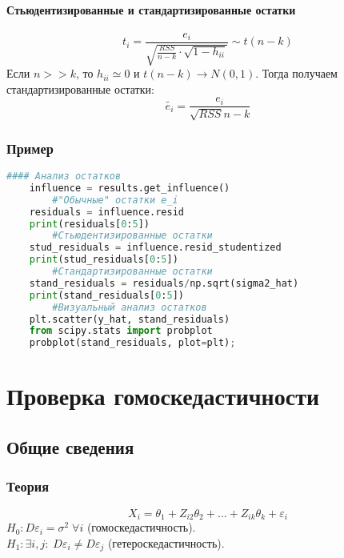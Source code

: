 \paragraph*{Стьюдентизированные и стандартизированные остатки}\label{cha:linreg/sec:det+ost/subsec:ost/subsubsec:theory/par:stu}

$$t_i = \frac{e_i}{\sqrt{\frac{RSS}{n-k} \cdot \sqrt{1-h_{ii}}}} \sim t(n-k)$$
Если $n >> k$, то $h_{ii} \simeq 0$ и $t(n-k) \to N(0,1)$. Тогда получаем стандартизированные остатки: 
$$\tilde{e_i} = \frac{e_i}{\sqrt{RSS}{n-k}}$$

\subsubsection*{Пример}\label{cha:linreg/sec:det+ost/subsec:ost/subsubsec:prob}

\begin{lstlisting}[language=Python]
	#### Анализ остатков
	influence = results.get_influence()
		#"Обычные" остатки e_i
	residuals = influence.resid
	print(residuals[0:5])
		#Стьюдентизированные остатки
	stud_residuals = influence.resid_studentized
	print(stud_residuals[0:5])
		#Стандартизированные остатки
	stand_residuals = residuals/np.sqrt(sigma2_hat)
	print(stand_residuals[0:5])
		#Визуальный анализ остатков
	plt.scatter(y_hat, stand_residuals)
	from scipy.stats import probplot
	probplot(stand_residuals, plot=plt);
\end{lstlisting}

\section{Проверка гомоскедастичности}\label{cha:linreg/sec:homosced}

\subsection{Общие сведения}\label{cha:linreg/sec:homosced/subsec:basic}

\subsubsection*{Теория}\label{cha:linreg/sec:homosced/subsec:basic/subsubsec:theory}

$$X_i = \theta_1 + Z_{i2}\theta_2 + \dots + Z_{ik}\theta_k + \varepsilon_i$$
$H_0: D \varepsilon_i = \sigma^2 \; \forall i$ (гомоскедастичность).\\
$H_1: \exists i, j: \; D \varepsilon_i \not = D \varepsilon_j$ (гетероскедастичность).

